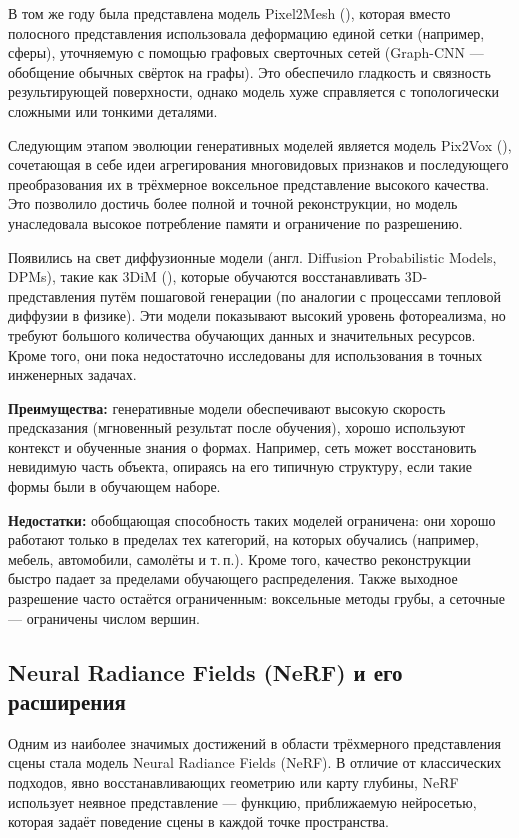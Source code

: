 В том же году была представлена модель Pixel2Mesh
(\cite{wang2018pixel2meshgenerating3dmesh}), которая вместо полосного
представления использовала деформацию единой сетки (например, сферы), уточняемую
с помощью графовых сверточных сетей (Graph-CNN — обобщение обычных свёрток на
графы). Это обеспечило гладкость и связность результирующей поверхности, однако
модель хуже справляется с топологически сложными или тонкими деталями.

Следующим этапом эволюции генеративных моделей является модель Pix2Vox
(\cite{Xie_2019}), сочетающая в себе идеи агрегирования многовидовых признаков и
последующего преобразования их в трёхмерное воксельное представление высокого
качества. Это позволило достичь более полной и точной реконструкции, но модель
унаследовала высокое потребление памяти и ограничение по разрешению.

Появились на свет диффузионные модели (англ. Diffusion Probabilistic Models,
DPMs), такие как 3DiM (\cite{watson2022novelviewsynthesisdiffusion}), которые
обучаются восстанавливать 3D-представления путём пошаговой генерации (по
аналогии с процессами тепловой диффузии в физике). Эти модели показывают высокий
уровень фотореализма, но требуют большого количества обучающих данных и
значительных ресурсов. Кроме того, они пока недостаточно исследованы для
использования в точных инженерных задачах.

\textbf{Преимущества:} генеративные модели обеспечивают высокую скорость
предсказания (мгновенный результат после обучения), хорошо используют контекст и
обученные знания о формах. Например, сеть может восстановить невидимую часть
объекта, опираясь на его типичную структуру, если такие формы были в обучающем
наборе.

\textbf{Недостатки:} обобщающая способность таких моделей ограничена: они хорошо
работают только в пределах тех категорий, на которых обучались (например,
мебель, автомобили, самолёты и т.\,п.). Кроме того, качество реконструкции
быстро падает за пределами обучающего распределения.  Также выходное разрешение
часто остаётся ограниченным: воксельные методы грубы, а сеточные — ограничены
числом вершин.

\subsection{Neural Radiance Fields (NeRF) и его расширения}

Одним из наиболее значимых достижений в области трёхмерного представления сцены
стала модель Neural Radiance Fields (NeRF). В отличие от классических подходов,
явно восстанавливающих геометрию или карту глубины, NeRF использует
неявное представление — функцию, приближаемую нейросетью, которая
задаёт поведение сцены в каждой точке пространства.

